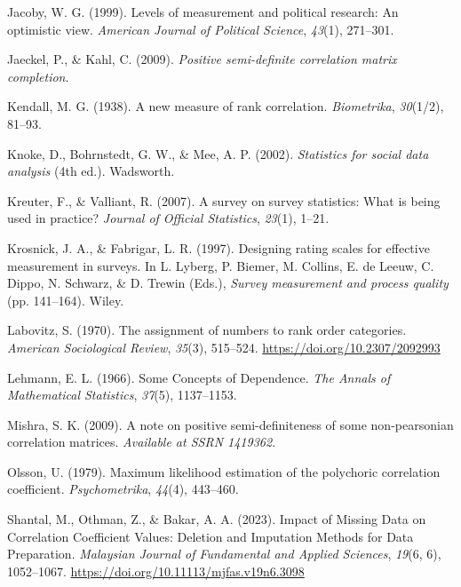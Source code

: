 \documentclass[
  12pt,
]{article}
\newlength{\cslhangindent}
\newenvironment{CSLReferences}[2] %
 {\begin{list}{}{%
  \setlength{\itemindent}{0pt}
  \setlength{\leftmargin}{0pt}
  \setlength{\parsep}{0pt}
  \ifodd #1
   \setlength{\leftmargin}{\cslhangindent}
   \setlength{\itemindent}{-1\cslhangindent}
  \fi
  \setlength{\itemsep}{#2\baselineskip}}}
 {\end{list}}
\theoremstyle{plain}
\theoremstyle{definition}
\theoremstyle{remark}
\begin{document}
\begin{CSLReferences}{1}{0}
Jacoby, W. G. (1999). Levels of measurement and political research: {An}
optimistic view. \emph{American Journal of Political Science},
\emph{43}(1), 271--301.

Jaeckel, P., \& Kahl, C. (2009). \emph{Positive semi-definite
correlation matrix completion}.

Kendall, M. G. (1938). A new measure of rank correlation.
\emph{Biometrika}, \emph{30}(1/2), 81--93.

Knoke, D., Bohrnstedt, G. W., \& Mee, A. P. (2002). \emph{Statistics for
social data analysis} (4th ed.). Wadsworth.

Kreuter, F., \& Valliant, R. (2007). A survey on survey statistics:
{What} is being used in practice? \emph{Journal of Official Statistics},
\emph{23}(1), 1--21.

Krosnick, J. A., \& Fabrigar, L. R. (1997). Designing rating scales for
effective measurement in surveys. In L. Lyberg, P. Biemer, M. Collins,
E. de Leeuw, C. Dippo, N. Schwarz, \& D. Trewin (Eds.), \emph{Survey
measurement and process quality} (pp. 141--164). Wiley.

Labovitz, S. (1970). The assignment of numbers to rank order categories.
\emph{American Sociological Review}, \emph{35}(3), 515--524.
\url{https://doi.org/10.2307/2092993}

Lehmann, E. L. (1966). Some {Concepts} of {Dependence}. \emph{The Annals
of Mathematical Statistics}, \emph{37}(5), 1137--1153.

Mishra, S. K. (2009). A note on positive semi-definiteness of some
non-pearsonian correlation matrices. \emph{Available at SSRN 1419362}.

Olsson, U. (1979). Maximum likelihood estimation of the polychoric
correlation coefficient. \emph{Psychometrika}, \emph{44}(4), 443--460.

Shantal, M., Othman, Z., \& Bakar, A. A. (2023). Impact of {Missing
Data} on {Correlation Coefficient Values}: {Deletion} and {Imputation
Methods} for {Data Preparation}. \emph{Malaysian Journal of Fundamental
and Applied Sciences}, \emph{19}(6, 6), 1052--1067.
\url{https://doi.org/10.11113/mjfas.v19n6.3098}


\end{CSLReferences}
\end{document}
